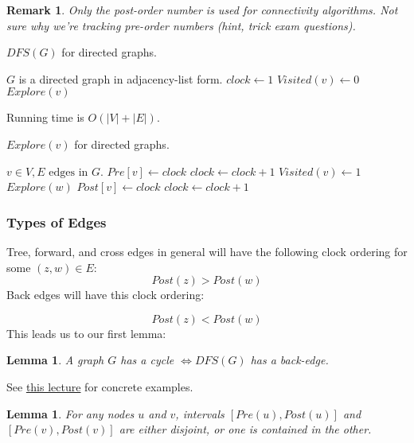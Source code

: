 \documentclass{article}
\newtheorem{lemma}[theorem]{Lemma}
\newtheorem{remark}{Remark}
\theoremstyle{definition}
\begin{document}
\begin{remark}
	Only the post-order number is used for connectivity algorithms. Not sure why we're tracking
	pre-order numbers (hint, trick exam questions).
\end{remark}

\begin{algorithm}[H]
\label{alg:dfs_dir}
\caption{$DFS(G)$ for directed graphs.}
\begin{algorithmic}[1]
\REQUIRE $G$ is a directed graph in adjacency-list form.
\STATE $clock \gets 1$ 
\STATE $Visited(v) \gets 0$
\ENDFOR
{}
\STATE $Explore(v)$
\ENDIF
\ENDFOR
\end{algorithmic}
 Running time is $O(|V|+|E|)$.
\end{algorithm}

\begin{algorithm}
\caption{$Explore(v)$ for directed graphs.}
\label{alg:explore_digraph}
\begin{algorithmic}[1]
\REQUIRE $v \in V, E \text{ edges in } G$.
\STATE$Pre[v] \gets clock$ 
\STATE $clock \gets clock + 1$
\STATE $Visited(v) \gets 1$
\STATE $Explore(w)$
\ENDIF
\ENDFOR
\STATE $Post[v] \gets clock$ 
\STATE $clock \gets clock + 1$
\end{algorithmic}
\end{algorithm}

\subsubsection{Types of Edges}
Tree, forward, and cross edges in general will have the following clock ordering for some $(z,w) \in E$: $$Post(z) > Post(w)$$ Back edges will have this clock ordering:

$$Post(z) < Post(w)$$ This leads us to our first lemma:
\begin{lemma}
\label{cycle}
	A graph $G$ has a cycle $\iff DFS(G)$ has a back-edge.
\end{lemma}

See \href{https://classroom.udacity.com/courses/ud401/lessons/10159691481/concepts/101975518340923}{this lecture} for concrete examples. 

\begin{lemma}
\label{containment}
For any nodes $u$ and $v$, intervals $[ Pre(u), Post(u) ]$ and $[Pre(v), Post(v)]$ are either disjoint, or one is contained in the other.
\end{lemma}
\end{document}
